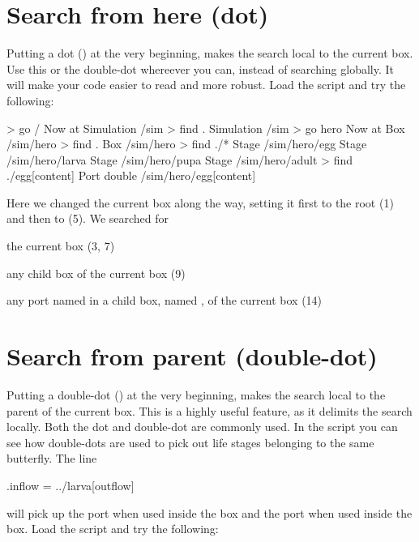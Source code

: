 \section{Search from here (dot)}
\label{ch:path-expressions-dot}
Putting a dot () at the very beginning, makes the search local to the current box. Use this or the double-dot whereever you can, instead of searching globally. It will make your code easier to read and more robust. Load the  script and try the following:

\lstset{numbers=left}
\begin{usdialog}
> go /
Now at Simulation /sim
> find .
Simulation /sim
> go hero
Now at Box /sim/hero
> find .
Box /sim/hero
> find ./*
Stage /sim/hero/egg
Stage /sim/hero/larva
Stage /sim/hero/pupa
Stage /sim/hero/adult
> find ./egg[content]
Port double /sim/hero/egg[content]
\end{usdialog}
\lstset{numbers=none}

\noindent 
Here we changed the current box along the way, setting it first to the root (1) and then to  (5). We searched for 
 \begin{compactitem}
\item the current box (3, 7)
\item any child box of the current box (9)
\item any port named  in a child box, named , of the current box (14)
\end{compactitem}

\section{Search from parent (double-dot)}
\label{ch:path-expressions-double-dot}
Putting a double-dot () at the very beginning, makes the search local to the parent of the current box. This is a highly useful feature, as it delimits the search locally. Both the dot and double-dot are commonly used. In the  script you can see how double-dots are used to pick out life stages belonging to the same butterfly. The line

\begin{boxscript}
.inflow = ../larva[outflow]
\end{boxscript}
will pick up the  port when used inside the  box and the  port when used inside the  box. Load the  script and try the following:

